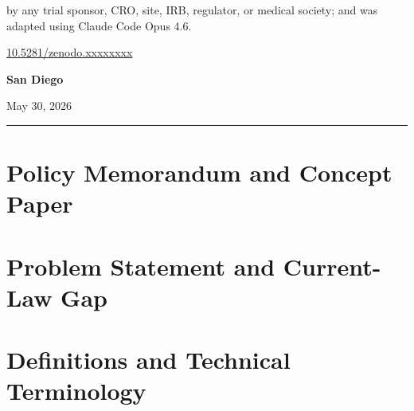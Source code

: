 \documentclass[11pt]{article}
\begin{document}
\begin{titlepage}
\begin{minipage}{0.86\textwidth}
by any trial sponsor, CRO, site, IRB, regulator, or medical society; and was
adapted using Claude Code Opus 4.6.
\par\vspace{\baselineskip}
\href{https://doi.org/10.5281/zenodo.xxxxxxxx}{10.5281/zenodo.xxxxxxxx}
\end{minipage}\par
\vspace{1.7cm}
{\bfseries San Diego\par}
\vspace{1.7cm}
{\normalsize May 30, 2026\par}
\vfill
{\color{billnavy}\rule{\textwidth}{1pt}}\par
\end{titlepage}

\tableofcontents
\clearpage
{}

\begin{abstract}

\end{abstract}


\vspace{0.2cm}

\section{Policy Memorandum and Concept Paper}
\label{sec:policy_memo}


\section{Problem Statement and Current-Law Gap}
\label{sec:problem_statement}


\section{Definitions and Technical Terminology}
\label{sec:definitions}

\end{document}
